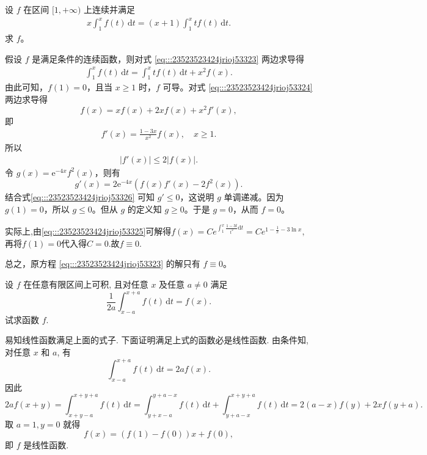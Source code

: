 \documentclass[../../main.tex]{subfiles}%
\begin{document}
\begin{example}
设 \( f \) 在区间 \([1,+\infty)\) 上连续并满足
\begin{align}
x \int_{1}^{x} f(t) \, \mathrm{d}t = (x + 1) \int_{1}^{x} t f(t) \, \mathrm{d}t. \label{eq:::23523523424jrioj53323}
\end{align}
求 \( f \)。
\end{example}
\begin{solution}
假设 \( f \) 是满足条件的连续函数，则对式 \eqref{eq:::23523523424jrioj53323}  两边求导得
\begin{align}
\int_{1}^{x} f(t) \, \mathrm{d}t = \int_{1}^{x} t f(t) \, \mathrm{d}t + x^2 f(x). \label{eq:::23523523424jrioj53324}
\end{align}
由此可知，\( f(1) = 0 \)，且当 \( x \geqslant 1 \) 时，\( f \) 可导。对式 \eqref{eq:::23523523424jrioj53324} 两边求导得
\[
f(x) = x f(x) + 2x f(x) + x^2 f'(x),
\]
即
\begin{align}
f'(x) = \frac{1 - 3x}{x^2} f(x), \quad x \geqslant 1. \label{eq:::23523523424jrioj53325}
\end{align}
所以
\begin{align}
|f'(x)| \leqslant 2 |f(x)|. \label{eq:::23523523424jrioj53326}
\end{align}
令 \( g(x) = \mathrm{e}^{-4x} f^2(x) \)，则有
\[
g'(x) = 2 \mathrm{e}^{-4x} \left( f(x) f'(x) - 2 f^2(x) \right).
\]
结合式\eqref{eq:::23523523424jrioj53326} 可知 \( g' \leqslant 0 \)，这说明 \( g \) 单调递减。因为 \( g(1) = 0 \)，所以 \( g \leqslant 0 \)。但从 \( g \) 的定义知 \( g \geqslant 0 \)。于是 \( g = 0 \)，从而 \( f = 0 \)。

实际上,由\eqref{eq:::23523523424jrioj53325}可解得$f\left( x \right) =Ce^{\int_1^x{\frac{1-3t}{t^2}\mathrm{d}t}}=Ce^{1-\frac{1}{x}-3\ln x},$再将$f(1)=0$代入得$C=0.$故$f\equiv 0.$

总之，原方程 \eqref{eq:::23523523424jrioj53323} 的解只有 \( f \equiv 0 \)。

\end{solution}

\begin{example}
设 \( f \) 在任意有限区间上可积, 且对任意 \( x \) 及任意 \( a \neq 0 \) 满足
\[
\frac{1}{2a} \int_{x - a}^{x + a} f(t) \, \mathrm{d}t = f(x).
\]
试求函数 \( f \).
\end{example}
\begin{solution}
易知线性函数满足上面的式子. 下面证明满足上式的函数必是线性函数. 由条件知, 对任意 \( x \) 和 \( a \), 有
\[
\int_{x - a}^{x + a} f(t) \, \mathrm{d}t = 2a f(x).
\]
因此
\[
2a f(x + y) = \int_{x + y - a}^{x + y + a} f(t) \, \mathrm{d}t = \int_{y + x - a}^{y + a - x} f(t) \, \mathrm{d}t + \int_{y + a - x}^{x + y + a} f(t) \, \mathrm{d}t
= 2(a - x) f(y) + 2x f(y + a).
\]
取 \( a = 1, y = 0 \) 就得
\[
f(x) = (f(1) - f(0))x + f(0),
\]
即 \( f \) 是线性函数.

\end{solution}
\end{document}

